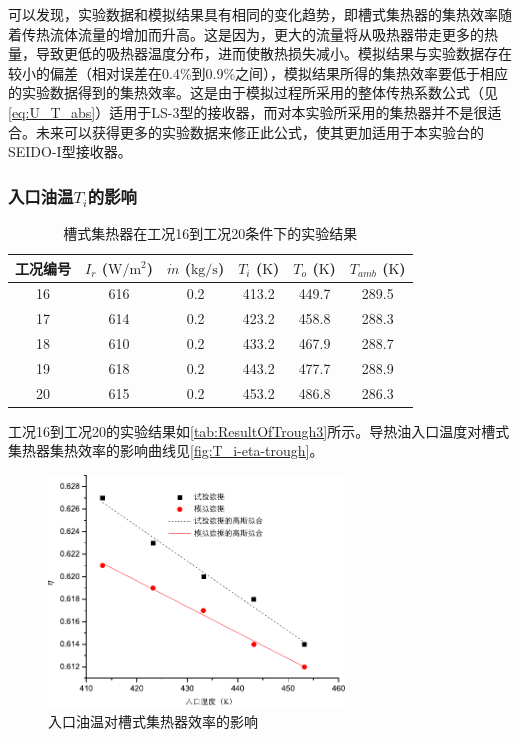 可以发现，实验数据和模拟结果具有相同的变化趋势，即槽式集热器的集热效率随着传热流体流量的增加而升高。这是因为，更大的流量将从吸热器带走更多的热量，导致更低的吸热器温度分布，进而使散热损失减小。模拟结果与实验数据存在较小的偏差（相对误差在0.4\%到0.9\%之间），模拟结果所得的集热效率要低于相应的实验数据得到的集热效率。这是由于模拟过程所采用的整体传热系数公式（见\autoref{eq:U_T_abs}）适用于LS-3型的接收器，而对本实验所采用的集热器并不是很适合。未来可以获得更多的实验数据来修正此公式，使其更加适用于本实验台的SEIDO-I型接收器。

\subsubsection{入口油温$T_i$的影响}

\begin{table}[htbp]
	\caption{槽式集热器在工况16到工况20条件下的实验结果}
	\centering
	\begin{tabular}{cccccc}
		\toprule
		工况编号	& $I_r$ ($\mathrm{W/m^2}$)	&	$\dot{m}$ ($\mathrm{kg/s}$)			&	$T_i$ ($\mathrm{K}$)	&	$T_o$ ($\mathrm{K}$)		&	$T_{amb}$ ($\mathrm{K}$)\\
		\midrule
		16	&	616	&	0.2	&	413.2	&	449.7	&	289.5\\
		17	&	614	&	0.2	&	423.2	&	458.8	&	288.3\\
		18	&	610	&	0.2	&	433.2	&	467.9	&	288.7	\\
		19	&	618	&	0.2	&	443.2	&	477.7	&	288.9\\
		20	&	615	&	0.2	&	453.2	&	486.8	&	286.3\\
		\bottomrule
	\end{tabular}
	\label{tab:ResultOfTrough3}
\end{table}
工况16到工况20的实验结果如\autoref{tab:ResultOfTrough3}所示。导热油入口温度对槽式集热器集热效率的影响曲线见\autoref{fig:T_i-eta-trough}。

\begin{figure}[!ht]
\centering
\includegraphics[width=0.7\textwidth]{fig/T_i-eta-trough}
\caption{入口油温对槽式集热器效率的影响}
\label{fig:T_i-eta-trough}
\end{figure}

